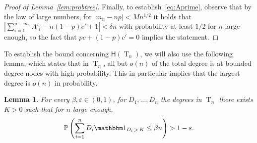 \documentclass[10pt]{amsart}
\newtheorem{lemm}[theo]{Lemma}\newtheorem{prop}[theo]{Proposition}\newtheorem{coro}[theo]{Corollary}\newtheorem{conj}[theo]{Conjecture}
\theoremstyle{definition}\newtheorem{defi}[theo]{Definition}\newtheorem{rema}[theo]{Remark}\newtheorem{exam}[theo]{Example}\newtheorem{exem}[theo]{Example}\newtheorem{nota}[theo]{Notation}
\renewcommand{\P}{\mathbb{P}}
\newcommand{\height}{\mathsf{H}}
\DeclareMathOperator{\rtree}{T}
\newcommand{\I}[1]{{\mathbbm 1}_{#1}}
\begin{document}
\begin{proof}[Proof of Lemma~\ref{lem:probtree}]
Finally, to establish~\eqref{eq:Aprime}, observe that by the law of large numbers, for $|m_n-np|<Mn^{1/2}$ it holds that $|\sum_{i=1}^{n-m_n}A'_i-n(1-p)c'+1|<\delta n$ with probability at least $1/2$ for $n$ large enough, so the fact that $pc+(1-p)c'=0$ implies the statement.
\end{proof}

To establish the bound concerning $\height(\rtree_{n})$, we will also use the following lemma, which states that in $\rtree_n$, all but $o(n)$ of the total degree is at bounded degree nodes with high probability. This in particular implies that the largest degree is $o(n)$ in probability.

\begin{lemm}\label{lem:nomasshighdegrees}
For every $\beta,\varepsilon \in (0,1)$, for $D_1,\dots, D_n$ the degrees in $\rtree_n$ there exists $K>0$ such that for $n$ large enough,
\[
\P\left(\sum_{i=1}^n D_i\I{D_i\,>\,K}\leq \beta n \right)>1-\varepsilon.
\]
\end{lemm}
\end{document}
